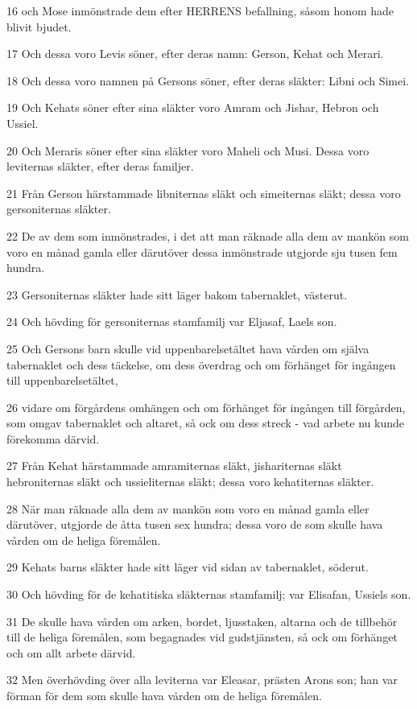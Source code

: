 \par 16 och Mose inmönstrade dem efter HERRENS befallning, såsom honom hade blivit bjudet.
\par 17 Och dessa voro Levis söner, efter deras namn: Gerson, Kehat och Merari.
\par 18 Och dessa voro namnen på Gersons söner, efter deras släkter: Libni och Simei.
\par 19 Och Kehats söner efter sina släkter voro Amram och Jishar, Hebron och Ussiel.
\par 20 Och Meraris söner efter sina släkter voro Maheli och Musi. Dessa voro leviternas släkter, efter deras familjer.
\par 21 Från Gerson härstammade libniternas släkt och simeiternas släkt; dessa voro gersoniternas släkter.
\par 22 De av dem som inmönstrades, i det att man räknade alla dem av mankön som voro en månad gamla eller därutöver dessa inmönstrade utgjorde sju tusen fem hundra.
\par 23 Gersoniternas släkter hade sitt läger bakom tabernaklet, västerut.
\par 24 Och hövding för gersoniternas stamfamilj var Eljasaf, Laels son.
\par 25 Och Gersons barn skulle vid uppenbarelsetältet hava vården om själva tabernaklet och dess täckelse, om dess överdrag och om förhänget för ingången till uppenbarelsetältet,
\par 26 vidare om förgårdens omhängen och om förhänget för ingången till förgården, som omgav tabernaklet och altaret, så ock om dess streck - vad arbete nu kunde förekomma därvid.
\par 27 Från Kehat härstammade amramiternas släkt, jishariternas släkt hebroniternas släkt och ussieliternas släkt; dessa voro kehatiternas släkter.
\par 28 När man räknade alla dem av mankön som voro en månad gamla eller därutöver, utgjorde de åtta tusen sex hundra; dessa voro de som skulle hava vården om de heliga föremålen.
\par 29 Kehats barns släkter hade sitt läger vid sidan av tabernaklet, söderut.
\par 30 Och hövding för de kehatitiska släkternas stamfamilj; var Elisafan, Ussiels son.
\par 31 De skulle hava vården om arken, bordet, ljusstaken, altarna och de tillbehör till de heliga föremålen, som begagnades vid gudstjänsten, så ock om förhänget och om allt arbete därvid.
\par 32 Men överhövding över alla leviterna var Eleasar, prästen Arons son; han var förman för dem som skulle hava vården om de heliga föremålen.
